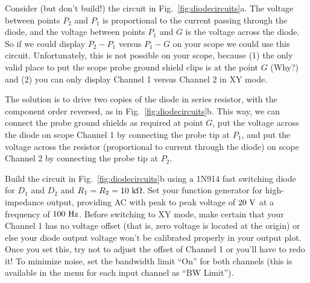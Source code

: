 Consider (but don't build!) the circuit in Fig.~\ref{fig:diodecircuits}a.  The voltage between points $P_2$ and $P_1$ is proportional to the current passing through the diode, and the voltage between points $P_1$ and $G$ is the voltage across the diode.  So if we could display $P_2-P_1$ versus $P_1-G$ on your scope we could use this circuit.  Unfortunately, this is not possible on your scope, because (1) the only valid place to put the scope probe ground shield clips is at the point $G$ (Why?) and (2) you can only display Channel 1 versus Channel 2 in XY mode.   

The solution is to drive two copies of the diode in series resistor, with the component order reversed, as in Fig.~\ref{fig:diodecircuits}b.  This way, we can connect the probe ground shields as required at point $G$, put the voltage across the diode on scope Channel 1 by connecting the probe tip at $P_1$, and put the voltage across the resistor (proportional to current through the diode) on scope Channel 2 by connecting the probe tip at $P_2$.

Build the circuit in Fig.~\ref{fig:diodecircuits}b using a 1N914 fast switching diode for $D_1$ and $D_2$ and $R_1= R_2 = 10~{\rm k\Omega}$.  Set your function generator for high-impedance output, providing AC with peak to peak voltage of $20~\rm V$ at a frequency of $100~\rm Hz$.  Before switching to XY mode, make certain that your Channel 1 has no voltage offset (that is, zero voltage is located at the origin) or else your diode output voltage won't be calibrated properly in your output plot.   Once you set this, try not to adjust the offset of Channel 1 or you'll have to redo it!  To minimize noise, set the bandwidth limit ``On'' for both channels (this is available in the menu for each input channel as ``BW Limit'').


